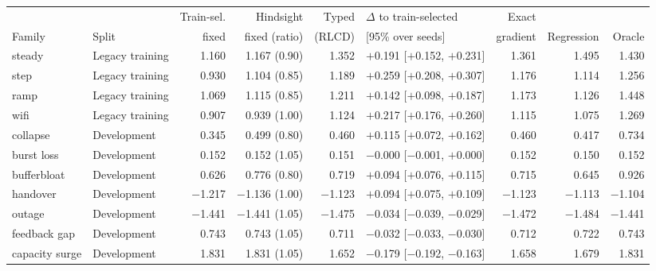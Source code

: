 \begin{tabular}{llrrrlrrr}
\toprule
 & & Train-sel. & Hindsight & Typed & $\Delta$ to train-selected & Exact & & \\
Family & Split & fixed & fixed (ratio) & (RLCD) & [95\% over seeds] & gradient & Regression & Oracle \\
\midrule
steady & Legacy training & 1.160 & 1.167 (0.90) & 1.352 & $+$0.191 [$+$0.152, $+$0.231] & 1.361 & 1.495 & 1.430 \\
step & Legacy training & 0.930 & 1.104 (0.85) & 1.189 & $+$0.259 [$+$0.208, $+$0.307] & 1.176 & 1.114 & 1.256 \\
ramp & Legacy training & 1.069 & 1.115 (0.85) & 1.211 & $+$0.142 [$+$0.098, $+$0.187] & 1.173 & 1.126 & 1.448 \\
wifi & Legacy training & 0.907 & 0.939 (1.00) & 1.124 & $+$0.217 [$+$0.176, $+$0.260] & 1.115 & 1.075 & 1.269 \\
collapse & Development & 0.345 & 0.499 (0.80) & 0.460 & $+$0.115 [$+$0.072, $+$0.162] & 0.460 & 0.417 & 0.734 \\
burst loss & Development & 0.152 & 0.152 (1.05) & 0.151 & $-$0.000 [$-$0.001, $+$0.000] & 0.152 & 0.150 & 0.152 \\
bufferbloat & Development & 0.626 & 0.776 (0.80) & 0.719 & $+$0.094 [$+$0.076, $+$0.115] & 0.715 & 0.645 & 0.926 \\
handover & Development & $-$1.217 & $-$1.136 (1.00) & $-$1.123 & $+$0.094 [$+$0.075, $+$0.109] & $-$1.123 & $-$1.113 & $-$1.104 \\
outage & Development & $-$1.441 & $-$1.441 (1.05) & $-$1.475 & $-$0.034 [$-$0.039, $-$0.029] & $-$1.472 & $-$1.484 & $-$1.441 \\
feedback gap & Development & 0.743 & 0.743 (1.05) & 0.711 & $-$0.032 [$-$0.033, $-$0.030] & 0.712 & 0.722 & 0.743 \\
capacity surge & Development & 1.831 & 1.831 (1.05) & 1.652 & $-$0.179 [$-$0.192, $-$0.163] & 1.658 & 1.679 & 1.831 \\
\bottomrule
\end{tabular}
